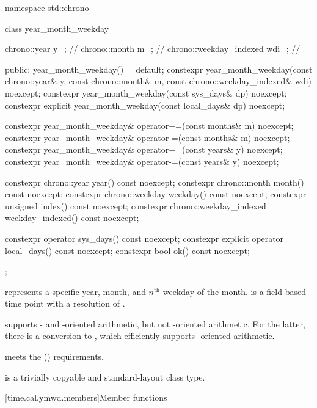\begin{codeblock}
namespace std::chrono {
  class year_month_weekday {
    chrono::year            y_;         // \expos
    chrono::month           m_;         // \expos
    chrono::weekday_indexed wdi_;       // \expos

  public:
    year_month_weekday() = default;
    constexpr year_month_weekday(const chrono::year& y, const chrono::month& m,
                                 const chrono::weekday_indexed& wdi) noexcept;
    constexpr year_month_weekday(const sys_days& dp) noexcept;
    constexpr explicit year_month_weekday(const local_days& dp) noexcept;

    constexpr year_month_weekday& operator+=(const months& m) noexcept;
    constexpr year_month_weekday& operator-=(const months& m) noexcept;
    constexpr year_month_weekday& operator+=(const years& y)  noexcept;
    constexpr year_month_weekday& operator-=(const years& y)  noexcept;

    constexpr chrono::year            year()            const noexcept;
    constexpr chrono::month           month()           const noexcept;
    constexpr chrono::weekday         weekday()         const noexcept;
    constexpr unsigned                index()           const noexcept;
    constexpr chrono::weekday_indexed weekday_indexed() const noexcept;

    constexpr          operator sys_days()   const noexcept;
    constexpr explicit operator local_days() const noexcept;
    constexpr bool ok() const noexcept;
  };
}
\end{codeblock}

\pnum
{} represents a specific year, month,
and $n^\text{th}$ weekday of the month.
 is a field-based time point with a resolution of .
\begin{note}
 supports - and -oriented arithmetic,
but not -oriented arithmetic.
For the latter, there is a conversion to ,
which efficiently supports -oriented arithmetic.
\end{note}
 meets the  () requirements.

\pnum
{} is a trivially copyable and standard-layout class type.

[time.cal.ymwd.members]{Member functions}

